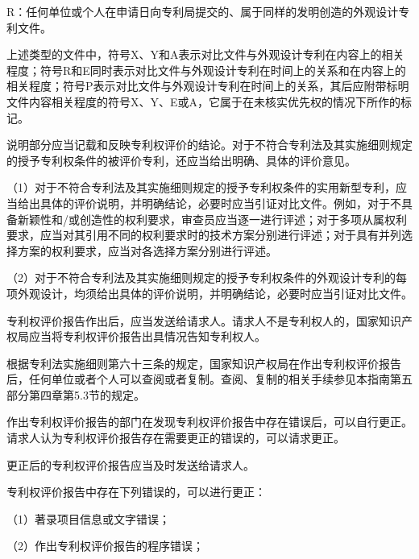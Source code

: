 R：任何单位或个人在申请日向专利局提交的、属于同样的发明创造的外观设计专利文件。

上述类型的文件中，符号X、Y和A表示对比文件与外观设计专利在内容上的相关程度；符号R和E同时表示对比文件与外观设计专利在时间上的关系和在内容上的相关程度；符号P表示对比文件与外观设计专利在时间上的关系，其后应附带标明文件内容相关程度的符号X、Y、E或A，它属于在未核实优先权的情况下所作的标记。

说明部分应当记载和反映专利权评价的结论。对于不符合专利法及其实施细则规定的授予专利权条件的被评价专利，还应当给出明确、具体的评价意见。

{\setlength{\parindent}{17.1bp}（1）对于不符合专利法及其实施细则规定的授予专利权条件的实用新型专利，应当给出具体的评价说明，并明确结论，必要时应当引证对比文件。例如，对于不具备新颖性和/或创造性的权利要求，审查员应当逐一进行评述；对于多项从属权利要求，应当对其引用不同的权利要求时的技术方案分别进行评述；对于具有并列选择方案的权利要求，应当对各选择方案分别进行评述。\par}

{\setlength{\parindent}{17.1bp}（2）对于不符合专利法及其实施细则规定的授予专利权条件的外观设计专利的每项外观设计，均须给出具体的评价说明，并明确结论，必要时应当引证对比文件。\par}

专利权评价报告作出后，应当发送给请求人。请求人不是专利权人的，国家知识产权局应当将专利权评价报告出具情况告知专利权人。

根据专利法实施细则第六十三条的规定，国家知识产权局在作出专利权评价报告后，任何单位或者个人可以查阅或者复制。查阅、复制的相关手续参见本指南第五部分第四章第5.3节的规定。

作出专利权评价报告的部门在发现专利权评价报告中存在错误后，可以自行更正。请求人认为专利权评价报告存在需要更正的错误的，可以请求更正。

更正后的专利权评价报告应当及时发送给请求人。

专利权评价报告中存在下列错误的，可以进行更正：

{\setlength{\parindent}{17.1bp}（1）著录项目信息或文字错误；\par}

{\setlength{\parindent}{17.1bp}（2）作出专利权评价报告的程序错误；\par}

